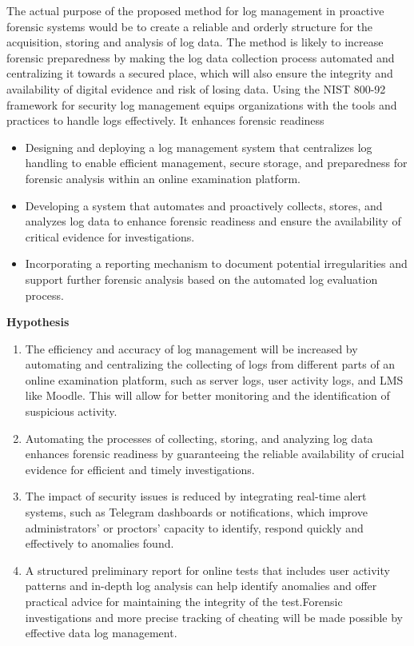 The actual purpose of the proposed method for log management in proactive forensic systems would be to create a reliable and orderly structure for the acquisition, storing and analysis of log data. The method is likely to increase forensic preparedness by making the log data collection process automated and centralizing it towards a secured place, which will also ensure the integrity and availability of digital evidence and risk of losing data. Using the NIST 800-92 framework for security log management equips organizations with the tools and practices to handle logs effectively. It enhances forensic readiness
\begin{itemize}
    \item Designing and deploying a log management system that centralizes log handling to enable efficient management, secure storage, and preparedness for forensic analysis within an online examination platform.
    \item Developing a system that automates and proactively collects, stores, and analyzes log data to enhance forensic readiness and ensure the availability of critical evidence for investigations.
    \item Incorporating a reporting mechanism to document potential irregularities and 
    support further forensic analysis based on the automated log evaluation process.
\end{itemize}


\textbf{Hypothesis}

\begin{enumerate}
    \item The efficiency and accuracy of log management will be increased by automating and centralizing the collecting of logs from different parts of an online examination platform, such as server logs, user activity logs, and LMS like Moodle. This will allow for better monitoring and the identification of suspicious activity.
    \item Automating the processes of collecting, storing, and analyzing log data enhances forensic readiness by guaranteeing the reliable availability of crucial evidence for efficient and timely investigations.
    \item The impact of security issues is reduced by integrating real-time alert systems, such as Telegram dashboards or notifications, which improve administrators' or proctors' capacity to identify, respond quickly and effectively to anomalies found.
    \item A structured preliminary report for online tests that includes user activity patterns and in-depth log analysis can help identify anomalies and offer practical advice for maintaining the integrity of the test.Forensic investigations and more precise tracking of cheating will be made possible by effective data log management.
\end{enumerate}



